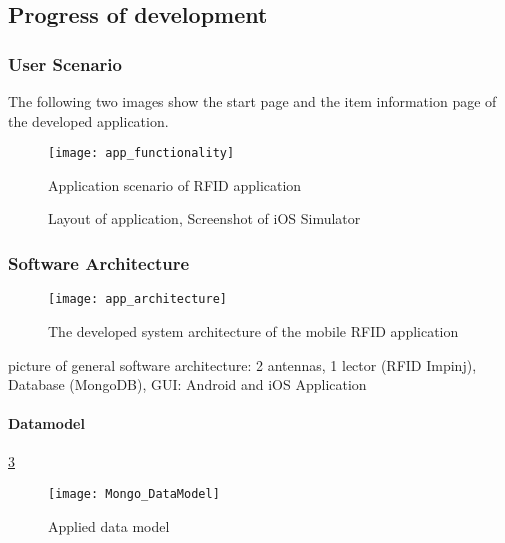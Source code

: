\subsection{Progress of development}

\subsubsection{User Scenario}

The following two images show the start page and the item information page of the developed application. 



\begin{figure}
\centering
\texttt{[image: app\_functionality]} 
\caption{\label{fig:appfunctionality}Application scenario of RFID application} 
\end{figure}


\begin{figure}
\centering
{}
\caption{Layout of application, Screenshot of iOS Simulator}
\end{figure}




\subsubsection{Software Architecture}

\begin{figure}
\centering
\texttt{[image: app\_architecture]} 
\caption{\label{fig:apparchitecture}The developed system architecture of the mobile RFID application} 
\end{figure}

picture of general software architecture: 
2 antennas, 1 lector (RFID Impinj), Database (MongoDB), GUI: Android and  iOS Application 



\paragraph{Datamodel}

\ref{fig:datamodel}

\begin{figure}
\centering
\texttt{[image: Mongo\_DataModel]} 
\caption{\label{fig:datamodel}Applied data model} 
\end{figure}

